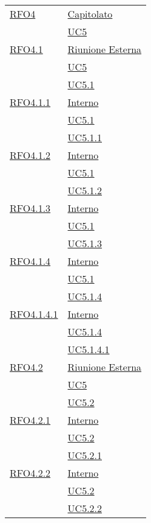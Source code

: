 \begin{longtable}{|>{\centering}m{5cm}|m{5cm}<{\centering}|}
\hyperlink{RFO4}{RFO4} & \hyperlink{Capitolato}{Capitolato}\\
& \hyperref[UC5]{UC5}\\ \hline

\hyperlink{RFO4.1}{RFO4.1} & \hyperlink{Riunione Esterna}{Riunione Esterna}\\
& \hyperref[UC5]{UC5}\\
& \hyperref[UC5.1]{UC5.1}\\ \hline

\hyperlink{RFO4.1.1}{RFO4.1.1} & \hyperlink{Interno}{Interno}\\
& \hyperref[UC5.1]{UC5.1}\\
& \hyperref[UC5.1.1]{UC5.1.1}\\ \hline

\hyperlink{RFO4.1.2}{RFO4.1.2} & \hyperlink{Interno}{Interno}\\
& \hyperref[UC5.1]{UC5.1}\\
& \hyperref[UC5.1.2]{UC5.1.2}\\ \hline

\hyperlink{RFO4.1.3}{RFO4.1.3} & \hyperlink{Interno}{Interno}\\
& \hyperref[UC5.1]{UC5.1}\\
& \hyperref[UC5.1.3]{UC5.1.3}\\ \hline

\hyperlink{RFO4.1.4}{RFO4.1.4} & \hyperlink{Interno}{Interno}\\
& \hyperref[UC5.1]{UC5.1}\\
& \hyperref[UC5.1.4]{UC5.1.4}\\ \hline

\hyperlink{RFO4.1.4.1}{RFO4.1.4.1} & \hyperlink{Interno}{Interno}\\
& \hyperref[UC5.1.4]{UC5.1.4}\\
& \hyperref[UC5.1.4.1]{UC5.1.4.1}\\ \hline

\hyperlink{RFO4.2}{RFO4.2} & \hyperlink{Riunione Esterna}{Riunione Esterna}\\
& \hyperref[UC5]{UC5}\\
& \hyperref[UC5.2]{UC5.2}\\ \hline

\hyperlink{RFO4.2.1}{RFO4.2.1} & \hyperlink{Interno}{Interno}\\
& \hyperref[UC5.2]{UC5.2}\\
& \hyperref[UC5.2.1]{UC5.2.1}\\ \hline

\hyperlink{RFO4.2.2}{RFO4.2.2} & \hyperlink{Interno}{Interno}\\
& \hyperref[UC5.2]{UC5.2}\\
& \hyperref[UC5.2.2]{UC5.2.2}\\ \hline


\end{longtable}
